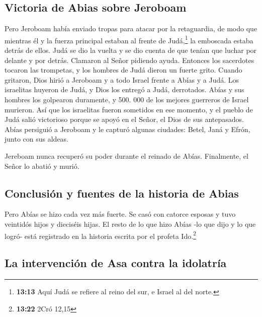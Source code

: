 \hypertarget{victoria-de-abias-sobre-jeroboam}{%
\subsection{Victoria de Abias sobre
Jeroboam}\label{victoria-de-abias-sobre-jeroboam}}

 Pero Jeroboam había enviado tropas para atacar por la
retaguardia, de modo que mientras él y la fuerza principal estaban al
frente de Judá,\footnote{\textbf{13:13} Aquí Judá se refiere al reino
  del sur, e Israel al del norte.} la emboscada estaba detrás de ellos.
 Judá se dio la vuelta y se dio cuenta de que tenían que
luchar por delante y por detrás. Clamaron al Señor pidiendo ayuda.
Entonces los sacerdotes tocaron las trompetas,  y los
hombres de Judá dieron un fuerte grito. Cuando gritaron, Dios hirió a
Jeroboam y a todo Israel frente a Abías y a Judá.  Los
israelitas huyeron de Judá, y Dios los entregó a Judá, derrotados.
 Abías y sus hombres los golpearon duramente, y 500. 000
de los mejores guerreros de Israel murieron.  Así que los
israelitas fueron sometidos en ese momento, y el pueblo de Judá salió
victorioso porque se apoyó en el Señor, el Dios de sus antepasados.
 Abías persiguió a Jeroboam y le capturó algunas
ciudades: Betel, Janá y Efrón, junto con sus aldeas.

 Jereboam nunca recuperó su poder durante el reinado de
Abías. Finalmente, el Señor lo abatió y murió.

\hypertarget{conclusiuxf3n-y-fuentes-de-la-historia-de-abias}{%
\subsection{Conclusión y fuentes de la historia de
Abias}\label{conclusiuxf3n-y-fuentes-de-la-historia-de-abias}}

 Pero Abías se hizo cada vez más fuerte. Se casó con
catorce esposas y tuvo veintidós hijos y dieciséis hijas.
 El resto de lo que hizo Abías -lo que dijo y lo que
logró- está registrado en la historia escrita por el profeta
Ido.\footnote{\textbf{13:22} 2Cró 12,15}

\hypertarget{la-intervenciuxf3n-de-asa-contra-la-idolatruxeda}{%
\subsection{La intervención de Asa contra la
idolatría}\label{la-intervenciuxf3n-de-asa-contra-la-idolatruxeda}}

